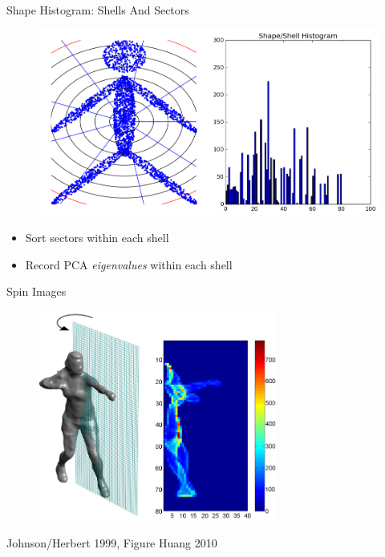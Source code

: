 \documentclass{beamer}
\begin{document}
\begin{frame}{Shape Histogram: Shells And Sectors}

\begin{figure}[t]
	\centering
    \includegraphics[width=\textwidth]{ShapeHistShellsSectors.png}
\end{figure}

\begin{itemize}[label=$\vartriangleright$]
\item Sort sectors within each shell
\item Record PCA {\em eigenvalues} within each shell
\end{itemize}

\end{frame}

\begin{frame}{Spin Images}

\begin{figure}[t]
	\centering
    \includegraphics[width=0.7\textwidth]{SpinImage.png}
\end{figure}

\small Johnson/Herbert 1999, Figure Huang 2010

\end{frame}
\end{document}
